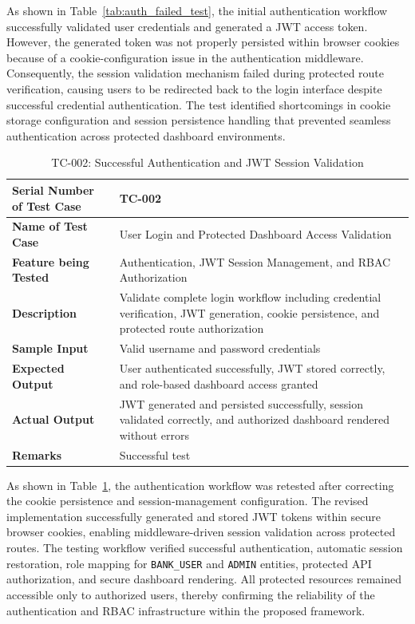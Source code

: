 As shown in Table~\ref{tab:auth_failed_test}, the initial authentication workflow successfully validated user credentials and generated a JWT access token. However, the generated token was not properly persisted within browser cookies because of a cookie-configuration issue in the authentication middleware. Consequently, the session validation mechanism failed during protected route verification, causing users to be redirected back to the login interface despite successful credential authentication. The test identified shortcomings in cookie storage configuration and session persistence handling that prevented seamless authentication across protected dashboard environments.


\begin{table}[H]
\centering
\caption{TC-002: Successful Authentication and JWT Session Validation}
\label{tab:auth_success_test}
\vspace{0.2cm}
\begin{tabular}{|p{4.2cm}|p{9cm}|}
\hline
\textbf{Serial Number of Test Case} & TC-002 \\ \hline
\textbf{Name of Test Case} & User Login and Protected Dashboard Access Validation \\ \hline
\textbf{Feature being Tested} & Authentication, JWT Session Management, and RBAC Authorization \\ \hline
\textbf{Description} & Validate complete login workflow including credential verification, JWT generation, cookie persistence, and protected route authorization \\ \hline
\textbf{Sample Input} & Valid username and password credentials \\ \hline
\textbf{Expected Output} & User authenticated successfully, JWT stored correctly, and role-based dashboard access granted \\ \hline
\textbf{Actual Output} & JWT generated and persisted successfully, session validated correctly, and authorized dashboard rendered without errors \\ \hline
\textbf{Remarks} & Successful test \\ \hline
\end{tabular}
\end{table}

As shown in Table~\ref{tab:auth_success_test}, the authentication workflow was retested after correcting the cookie persistence and session-management configuration. The revised implementation successfully generated and stored JWT tokens within secure browser cookies, enabling middleware-driven session validation across protected routes. The testing workflow verified successful authentication, automatic session restoration, role mapping for \texttt{BANK\_USER} and \texttt{ADMIN} entities, protected API authorization, and secure dashboard rendering. All protected resources remained accessible only to authorized users, thereby confirming the reliability of the authentication and RBAC infrastructure within the proposed framework.

